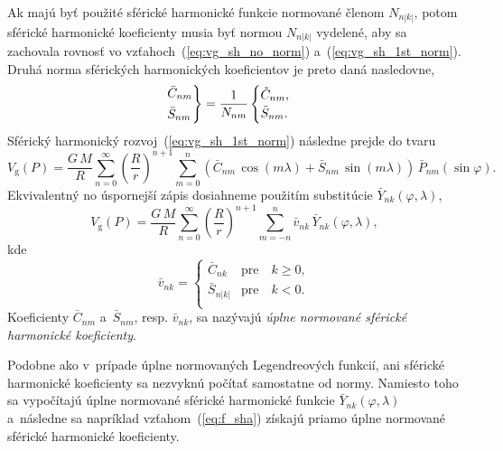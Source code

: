 \documentclass[a4paper, 12pt]{book}
\newcommand{\gidx}{\mathrm g}
\begin{document}
Ak majú byť použité sférické harmonické funkcie normované členom $N_{n|k|}$,
potom sférické harmonické koeficienty musia byť normou $N_{n|k|}$ vydelené, aby
sa zachovala rovnosť vo vzťahoch~(\ref{eq:vg_sh_no_norm})
a~(\ref{eq:vg_sh_1st_norm}).  Druhá norma sférických harmonických koeficientov
je preto daná nasledovne,
%
\begin{equation}
\begin{rcases}
\bar{C}_{nm}\\
\bar{S}_{nm}
\end{rcases}
= \frac{1}{N_{nm}}
\begin{cases}
\tilde{C}_{nm}{,}\\
\tilde{S}_{nm}{.}
\end{cases}
\end{equation}
%
Sférický harmonický rozvoj~(\ref{eq:vg_sh_1st_norm}) následne prejde do tvaru
%
\begin{equation}
\label{eq:vg_sh_2nd_norm}
V_\gidx(P) = \frac{G \, M}{R} \sum_{n = 0}^\infty \left( \frac{R}{r} \right)^{n
+ 1} \sum_{m = 0}^{n} \left( \bar{C}_{nm} \, \cos(m\lambda) + \bar{S}_{nm} \,
\sin(m\lambda)\right) \, \bar{P}_{nm}(\sin\varphi){.}
\end{equation}
%
Ekvivalentný no úspornejší zápis dosiahneme použitím substitúcie
$\bar{Y}_{nk}(\varphi, \lambda)$,
%
\begin{equation}
\label{eq:vg_sh_2nd_norm_ynk}
V_\gidx(P) = \frac{G \, M}{R} \sum_{n = 0}^\infty \left( \frac{R}{r} \right)^{n
+ 1} \sum_{m = -n}^{n} \bar{v}_{nk} \, \bar{Y}_{nk}(\varphi, \lambda){,}
\end{equation}
kde
%
\begin{equation}
\bar{v}_{nk} =
%
\begin{cases}
\bar{C}_{nk}  &\text{pre} \quad k \geq 0{,}\\
\bar{S}_{n|k|}  &\text{pre} \quad k < 0{.}\\
\end{cases}
\end{equation}
%
Koeficienty $\bar{C}_{nm}$ a~$\bar{S}_{nm}$, resp. $\bar{v}_{nk}$, sa nazývajú
\emph{úplne normované sférické harmonické koeficienty}.

Podobne ako v~prípade úplne normovaných Legendreových funkcií, ani sférické
harmonické koeficienty sa nezvyknú počítať samostatne od normy.  Namiesto toho
sa vypočítajú úplne normované sférické harmonické funkcie
$\bar{Y}_{nk}(\varphi, \lambda)$ a~následne sa napríklad
vzťahom~(\ref{eq:f_sha}) získajú priamo úplne normované sférické harmonické
koeficienty.
\end{document}
